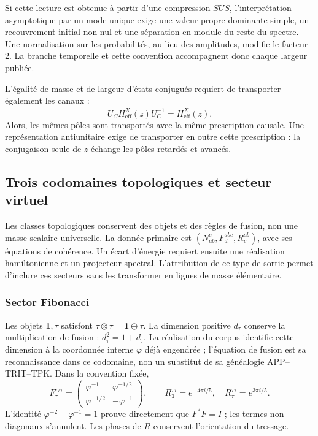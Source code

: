 Si cette lecture est obtenue à partir d'une compression \(SUS\), l'interprétation
asymptotique par un mode unique exige une valeur propre dominante
simple, un recouvrement initial non nul et une séparation en module du reste
du spectre. Une normalisation sur les probabilités, au lieu des
amplitudes, modifie le facteur \(2\). La branche temporelle et cette convention
accompagnent donc chaque largeur publiée.

L’égalité de masse et de largeur d’états conjugués requiert de transporter
également les canaux :
\[
 U_C H_{\mathrm{eff}}^X(z)U_C^{-1}=H_{\mathrm{eff}}^{\bar X}(z).
\]
Alors, les mêmes pôles sont transportés avec la même prescription
causale. Une représentation antiunitaire exige de transporter en outre cette
prescription : la conjugaison seule de \(z\) échange les pôles
retardés et avancés.

\subsection{Trois codomaines topologiques et secteur virtuel}
\label{vi:vi:subsec:topologicos-familias}

Les classes topologiques conservent des objets et des règles de fusion, non une
masse scalaire universelle. La donnée primaire est
\((N_{ab}^{c},F^{abc}_d,R^{ab}_c)\), avec ses équations de cohérence.
Un écart d’énergie requiert ensuite une réalisation hamiltonienne et
un projecteur spectral. L’attribution de ce type de sortie permet
d’inclure ces secteurs sans les transformer en lignes de masse élémentaire.

\subsubsection{Sector Fibonacci}

Les objets \(\mathbf1,\tau\) satisfont
\(\tau\otimes\tau=\mathbf1\oplus\tau\). La dimension positive
\(d_\tau\) conserve la multiplication de fusion :
\(d_\tau^2=1+d_\tau\). La réalisation du corpus identifie cette
dimension à la coordonnée interne \(\varphi\) déjà engendrée ;
l’équation de fusion est sa reconnaissance dans ce codomaine, non un
substitut de sa généalogie APP--TRIT--TPK. Dans la convention fixée,
\[
 F_\tau^{\tau\tau\tau}=\begin{pmatrix}
 \varphi^{-1}&\varphi^{-1/2}\\
 \varphi^{-1/2}&-\varphi^{-1}
 \end{pmatrix},\qquad
 R_{\mathbf1}^{\tau\tau}=e^{-4\pi i/5},\quad
 R_\tau^{\tau\tau}=e^{3\pi i/5}.
\]
L’identité \(\varphi^{-2}+\varphi^{-1}=1\) prouve directement
que \(F^*F=I\) ; les termes non diagonaux s’annulent. Les phases
de \(R\) conservent l’orientation du tressage.

